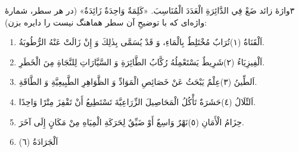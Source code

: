 \begin{JTamrin}{٣}{واژهٔ زائد}
ضَعْ فِي الدَّائِرَةِ الْعَدَدَ الْمُنَاسِبَ. «كَلِمَةٌ وَاحِدَةٌ زَائِدَةٌ»
(در هر سطر، شمارهٔ واژه‌ای که با توضیحِ آن سطر هماهنگ نیست را دایره بزن):

\begin{enumerate}
  \item اَلْقَنَاةُ (١)\quad تُرَابٌ مُخْتَلِطٌ بِالْمَاءِ، وَ قَدْ يُسَمَّى
        بِذٰلِكَ وَ إِنْ زَالَتْ عَنْهُ الرُّطُوبَةُ.
  \item اَلْفِيزِيَاءُ (٢)\quad شَرِيطٌ يَسْتَعْمِلُهُ رُكَّابُ
        الطَّائِرَةِ وَ السَّيَّارَاتِ لِلنَّجَاةِ مِنَ الْخَطَرِ.
  \item اَلطِّينُ (٣)\quad عِلْمٌ يَبْحَثُ عَنْ خَصَائِصِ الْمَوَادِّ وَ
        الظَّوَاهِرِ الطَّبِيعِيَّةِ وَ الطَّاقَةِ.
  \item اَلتِّلَالُ (٤)\quad حَشَرَةٌ تَأْكُلُ الْمَحَاصِيلَ الزِّرَاعِيَّةَ
        تَسْتَطِيعُ أَنْ تَقْفِزَ مِتْرًا وَاحِدًا.
  \item حِزَامُ الْأَمَانِ (٥)\quad نَهْرٌ وَاسِعٌ أَوْ ضَيِّقٌ
        لِحَرَكَةِ الْمِيَاهِ مِنْ مَكَانٍ إِلَى آخَرَ.
  \item اَلْجَرَادَةُ (٦)
\end{enumerate}
\end{JTamrin}

